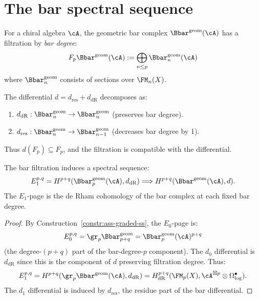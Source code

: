 \section{The bar spectral sequence}
\label{sec:bar-spectral-sequence}


\begin{construction}
\label{constr:bar-filtration}
For a chiral algebra $\cA$, the geometric bar complex $\Bbar^{\mathrm{geom}}(\cA)$ 
has a filtration by \emph{bar degree}:
\[
F_p \Bbar^{\mathrm{geom}}(\cA) := \bigoplus_{n \leq p} \Bbar^{\mathrm{geom}}_n(\cA)
\]
where $\Bbar^{\mathrm{geom}}_n$ consists of sections over $\FM_n(X)$.

The differential $d = d_{\mathrm{res}} + d_{\mathrm{dR}}$ decomposes as:
\begin{enumerate}[label=(\roman*)]
\item $d_{\mathrm{dR}}: \Bbar^{\mathrm{geom}}_n \to \Bbar^{\mathrm{geom}}_n$ (preserves bar degree).
\item $d_{\mathrm{res}}: \Bbar^{\mathrm{geom}}_n \to \Bbar^{\mathrm{geom}}_{n-1}$ (decreases bar degree by 1).
\end{enumerate}
Thus $d(F_p) \subseteq F_p$, and the filtration is compatible with the differential.
\end{construction}

\begin{theorem}
\label{thm:bar-ss}
The bar filtration induces a spectral sequence:
\[
E_1^{p,q} = H^{p+q}(\Bbar^{\mathrm{geom}}_p(\cA), d_{\mathrm{dR}}) 
\Longrightarrow H^{p+q}(\Bbar^{\mathrm{geom}}(\cA), d).
\]
The $E_1$-page is the de Rham cohomology of the bar complex at each fixed 
bar degree.
\end{theorem}

\begin{proof}
By Construction~\ref{constr:ass-graded-ss}, the $E_0$-page is:
\[
E_0^{p,q} = \gr_p \Bbar^{\mathrm{geom}}_{p+q} = \Bbar^{\mathrm{geom}}_p(\cA)^{p+q}
\]
(the degree-$(p+q)$ part of the bar-degree-$p$ component). The $d_0$ differential 
is $d_{\mathrm{dR}}$ since this is the component of $d$ preserving filtration 
degree. Thus:
\[
E_1^{p,q} = H^{p+q}(\gr_p \Bbar^{\mathrm{geom}}(\cA), d_{\mathrm{dR}}) 
         = H^{p+q}_{\mathrm{dR}}(\FM_p(X), \cA^{\boxtimes p} \otimes \Omega^\bullet_{\log}).
\]
The $d_1$ differential is induced by $d_{\mathrm{res}}$, the residue part of the 
bar differential.
\end{proof}


